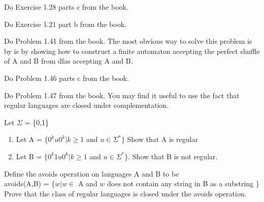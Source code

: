 

\usepackage{graphicx}
\usepackage{subfigure}



\homeworkheader{\classnameandsection}

\begin{problem}{1}
  Do Exercise 1.28 parts c from the book.
\end{problem}

\begin{problem}{2}
  Do Exercise 1.21 part b from the book.
\end{problem}

\begin{problem}{3}
  Do Problem 1.41 from the book. The most obvious way to solve this problem is by is by showing how to construct a finite automaton accepting the perfect shuffle of A and B from dfas accepting A and B.
\end{problem}

\begin{problem}{4}
  Do Problem 1.46 parts c from the book.
\end{problem}

\begin{problem}{5}
  Do Problem 1.47 from the book. You may find it useful to use the fact that regular languages are closed under complementation.
\end{problem}

\begin{problem}{6}
  Let $\Sigma$ = \{0,1\}
  \begin{enumerate}
    \item Let A = $\{ 0^ku0^k | k \ge 1$ and $u \in \Sigma^* \}$ Show that A is regular \\
    \item Let B = $\{ 0^k1u0^k | k \ge 1$ and $u \in \Sigma^* \}$. Show that B is not regular.
  \end{enumerate}
\end{problem}

\begin{problem}{7}
  Define the avoids operation on languages A and B to be \\
  \newline\indent avoids(A,B) = $\{ w | w \in$ A and $w$ does not contain any string in B as a substring $\}$ \\
  \newline Prove that the class of regular languages is closed under the avoids operation.
\end{problem}



